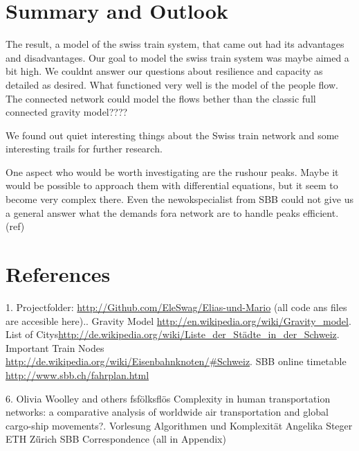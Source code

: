 \documentclass[11pt]{article}
\begin{document}
\section{Summary and Outlook}

The result, a model of the swiss train system, that came out had its advantages and disadvantages. Our goal to model the swiss train system was maybe aimed a bit high. We couldnt answer our questions about resilience and capacity as detailed as desired. What functioned very well is the model of the people flow. The connected network could model the flows bether than the classic full connected gravity model????\newline 

 

We found out quiet interesting things about the Swiss train network and some interesting trails for further research.\newline

One aspect who would be worth investigating are the rushour peaks. Maybe it would be possible to approach them with differential equations, but it seem to become very complex there. Even the newokspecialist from SBB could not  give us a general answer what the demands fora network are to handle peaks efficient. (ref)







\section{References}
1. Projectfolder: \url{http://Github.com/EleSwag/Elias-und-Mario} (all code ans files are accesible here).. Gravity Model \url{http://en.wikipedia.org/wiki/Gravity_model}. List of Citys\url{http://de.wikipedia.org/wiki/Liste_der_Städte_in_der_Schweiz}. Important Train Nodes \url{http://de.wikipedia.org/wiki/Eisenbahnknoten/\#Schweiz}. SBB online timetable \url{http://www.sbb.ch/fahrplan.html}\newline

6. Olivia Woolley and others  fsfölksflös Complexity in human transportation networks: a comparative analysis of worldwide air transportation and global cargo-ship movements?. Vorlesung Algorithmen und Komplexität Angelika Steger ETH Z\"ürich\newline
SBB Correspondence (all in Appendix)\newline
\end{document}
